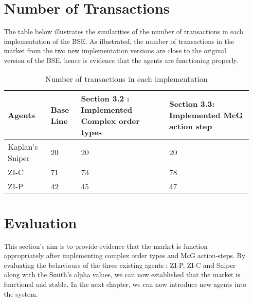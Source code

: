 \section{Number of Transactions}
The table below illustrates the similarities of the number of transactions in each implementation of the BSE. As illustrated, the number of transactions in the market from the two new implementation versions are close to the original version of the BSE, hence is evidence that the agents are functioning properly. 

\begin{table}[h]
\centering
\begin{tabular}{ |m||p{4cm}|p{4cm}|p{4cm}|} 
\hline
\textbf{Agents}& \textbf{Base Line} & \textbf{Section 3.2 : Implemented Complex order types} & \textbf{Section 3.3: Implemented McG action step} \\
\hline
\hline
Kaplan's Sniper & 20 & 20 & 20 \\ 
\hline
ZI-C & 71 & 73 & 78\\ 
\hline
ZI-P & 42 & 45 & 47 \\ 
\hline
\end{tabular}
\caption{Number of transactions in each implementation}  
\end{table}
\FloatBarrier

\section{Evaluation}
This section's aim is to provide evidence that the market is function appropriately after implementing complex order types and McG action-steps. By evaluating the behaviours of the three existing agents : ZI-P, ZI-C and Sniper along with the Smith's alpha values, we can now established that the market is functional and stable. In the next chapter, we can now introduce new agents into the system. 